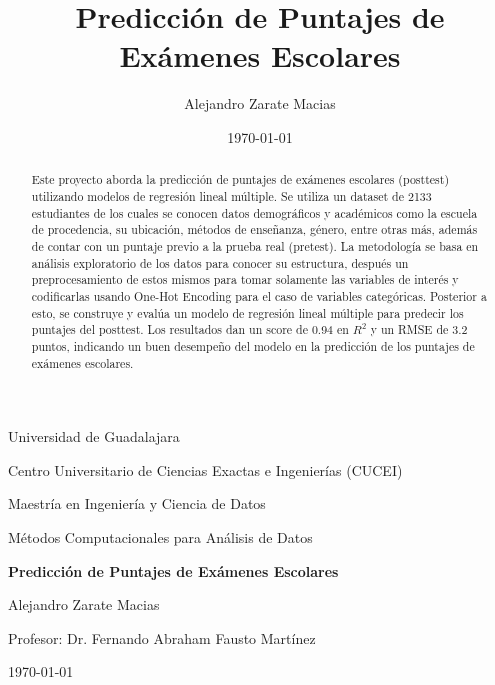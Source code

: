 \documentclass[12pt,letterpaper]{article}
\title{Predicción de Puntajes de Exámenes Escolares}
\author{Alejandro Zarate Macias}
\date{\today}
\begin{document}
\begin{titlepage}
    \centering
    \vspace*{2cm}
    {\Large Universidad de Guadalajara\par}
    \vspace{1cm}
    {\Large Centro Universitario de Ciencias Exactas e Ingenierías (CUCEI)\par}
    \vspace{1cm}
    {\Large Maestría en Ingeniería y Ciencia de Datos\par}
    \vspace{0.5cm}
    {\Large Métodos Computacionales para Análisis de Datos\par}
    \vspace{2cm}
    {\Huge\bfseries Predicción de Puntajes de Exámenes Escolares\par}
    \vspace{2cm}
    {\Large Alejandro Zarate Macias\par}
    \vspace{1cm}
    {\Large Profesor: Dr. Fernando Abraham Fausto Martínez\par}
    \vspace{2cm}
    {\Large \today\par}
\end{titlepage}


\begin{abstract}
\noindent
Este proyecto aborda la predicción de puntajes de exámenes escolares (posttest) utilizando modelos de regresión lineal múltiple. Se utiliza un dataset de 2133 estudiantes de los cuales se conocen datos demográficos y académicos como la escuela de procedencia, su ubicación, métodos de enseñanza, género, entre otras más, además de contar con un puntaje previo a la prueba real (pretest). La metodología se basa en análisis exploratorio de los datos para conocer su estructura, después un preprocesamiento de estos mismos para tomar solamente las variables de interés y codificarlas usando One-Hot Encoding para el caso de variables categóricas. Posterior a esto, se construye y evalúa un modelo de regresión lineal múltiple para predecir los puntajes del posttest. Los resultados dan un score de 0.94 en $R^2$ y un RMSE de 3.2 puntos, indicando un buen desempeño del modelo en la predicción de los puntajes de exámenes escolares.
\end{abstract}

\end{document}
